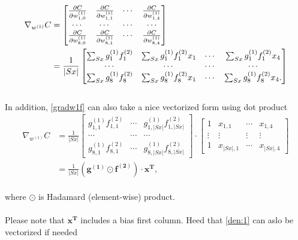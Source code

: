 \documentclass[12pt,titlepage]{article}
\begin{document}
\begin{align} \label{gradw1f}
\nabla_{w^{(1)}}C
&=\begin{bmatrix}
 \frac{\partial C}{\partial w_{1,0}^{(1)}}& \frac{\partial C}{\partial w_{1,1}^{(1)}} &\cdots &\frac{\partial C}{\partial w_{1,4}^{(1)}}\\ 
 \cdots&\cdots&\cdots&\cdots \\
 \frac{\partial C}{\partial w_{8,0}^{(1)}}& \frac{\partial C}{\partial w_{8,1}^{(1)}} &\cdots &\frac{\partial C}{\partial w_{8,4}^{(1)}}\\ 
 \end{bmatrix} \notag \\
&=\frac{1}{|Sx|}\begin{bmatrix}
 \sum_{Sx}g_{1}^{(1)}f_{1}^{(2)}&\sum_{Sx}g_{1}^{(1)}f_{1}^{(2)}x_{1}  &\cdots  &\sum_{Sx}g_{1}^{(1)}f_{1}^{(2)}x_{4} \\ 
 \cdots & \cdots & \cdots & \cdots\\ 
 \sum_{Sx}g_{8}^{(1)}f_{8}^{(2)}& \sum_{Sx}g_{8}^{(1)}f_{8}^{(2)}x_{1} & \cdots & \sum_{Sx}g_{8}^{(1)}f_{8}^{(2)}x_{4}. 
\end{bmatrix}
\end{align}
\\In addition, \eqref{gradw1f} can also take a nice vectorized form using dot product
\begin{equation} \label{gradw1f2}
\begin{split}
\nabla_{w^{(1)}}C
&=\frac{1}{|Sx|}\begin{bmatrix}
 g_{1,1}^{(1)}f_{1,1}^{(2)}& \cdots & g_{1,|Sx|}^{(1)}f_{1,|Sx|}^{(2)}\\ 
 \cdots& \cdots & \cdots\\ 
 g_{8,1}^{(1)}f_{8,1}^{(2)}& \cdots & g_{8,|Sx|}^{(1)}f_{8,|Sx|}^{(2)}
\end{bmatrix}\cdot\begin{bmatrix}
 1& x_{1,1} & \cdots & x_{1,4}\\ 
 \vdots& \vdots & \vdots & \vdots \\ 
 1& x_{|Sx|,1} & \cdots & x_{|Sx|,4}
\end{bmatrix}\\
&=\frac{1}{|Sx|}\left(\mathbf{g^{(1)}}\odot\mathbf{f^{(2)}} \right )\cdot \mathbf{x^{T}},
\end{split}
\end{equation}
\\where $\odot$ is Hadamard (element-wise) product.
\\\\Please note that $\mathbf{x^{T}}$ includes a bias first column. Heed that \eqref{den:1} can aslo be vectorized if needed
\end{document}
